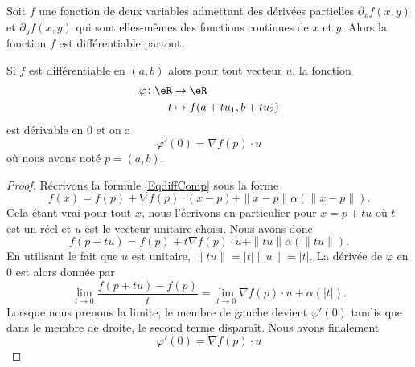 \begin{proposition} \label{PropExistDiffDeux}
    Soit $f$ une fonction de deux variables admettant des dérivées partielles $\partial_xf(x,y)$ et $\partial_yf(x,y)$ qui sont elles-mêmes des fonctions continues de $x$ et $y$. Alors la fonction $f$ est différentiable partout.
\end{proposition}

\begin{proposition}
    Si $f$ est différentiable en $(a,b)$ alors pour tout vecteur \( u\), la fonction
    \begin{equation}
        \begin{aligned}
            \varphi\colon \eR&\to \eR \\
            t&\mapsto   f(a+tu_1,b+tu_2) 
        \end{aligned}
    \end{equation}
    est dérivable en $0$ et on a
    \begin{equation}
        \varphi'(0)=\nabla f(p)\cdot u
    \end{equation}
    où nous avons noté $p=(a,b)$.
\end{proposition}

\begin{proof}
    Récrivons la formule \eqref{EqdiffComp} sous la forme
    \begin{equation}
        f(x)=f(p)+\nabla f(p)\cdot (x-p)+\| x-p \|\alpha(\| x-p \|).
    \end{equation}
    Cela étant vrai pour tout $x$, nous l'écrivons en particulier pour $x=p+tu$ où $t$ est un réel et $u$ est le vecteur unitaire choisi. Nous avons donc
    \begin{equation}
        f(p+tu)=f(p)+t\nabla f(p)\cdot u+\| tu \|\alpha(\| tu \|).
    \end{equation}
    En utilisant le fait que $u$ est unitaire, $\| tu \|=| t |\| u \|=| t |$. La dérivée de $\varphi$ en $0$ est alors donnée par
    \begin{equation}
        \lim_{t\to 0} \frac{ f(p+tu)-f(p) }{ t }=\lim_{t\to 0} \nabla f(p)\cdot u+\alpha(| t |).    
    \end{equation}
    Lorsque nous prenons la limite, le membre de gauche devient $\varphi'(0)$ tandis que dans le membre de droite, le second terme disparaît. Nous avons finalement
    \begin{equation}
        \varphi'(0)=\nabla f(p)\cdot u
    \end{equation}
\end{proof}

